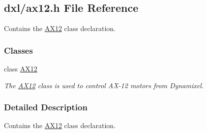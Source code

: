 \hypertarget{a00011}{}\subsection{dxl/ax12.h File Reference}
\label{a00011}


Contains the \hyperlink{a00001}{A\+X12} class declaration.  


\subsubsection*{Classes}
\begin{DoxyCompactItemize}
\item 
class \hyperlink{a00001}{A\+X12}
\begin{DoxyCompactList}\small\item\em The \hyperlink{a00001}{A\+X12} class is used to control A\+X-\/12 motors from Dynamixel. \end{DoxyCompactList}\end{DoxyCompactItemize}


\subsubsection{Detailed Description}
Contains the \hyperlink{a00001}{A\+X12} class declaration. 

